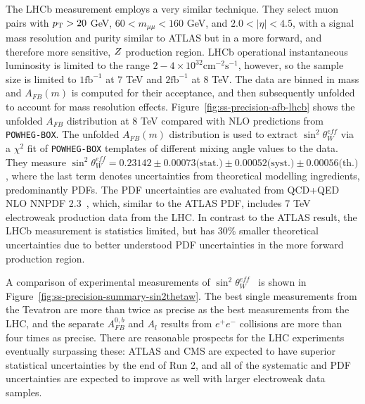 The LHCb measurement employs a very similar technique.  They select
muon pairs with $p_{\mathrm{T}} > 20$ GeV, $60 < m_{\mu\mu} < 160$ GeV, and $2.0 <
|\eta| < 4.5$, with a signal mass resolution and purity similar to
ATLAS but in a more forward, and therefore more sensitive, $Z$
production region.  LHCb operational instantaneous luminosity is
limited to the range $2-4\times
10^{32}\textrm{cm}^{-2}\textrm{s}^{-1}$, however, so the sample size
is limited to $1 \textrm{fb}^{-1}$ at 7 TeV and $2 \textrm{fb}^{-1}$
at 8 TeV.  The data are binned in mass and $A_{FB}(m)$ is computed for
their acceptance, and then subsequently unfolded to account for mass
resolution effects. Figure~\ref{fig:ss-precision-afb-lhcb} shows the
unfolded $A_{FB}$ distribution at 8 TeV compared with NLO predictions
from \texttt{POWHEG-BOX}.  The unfolded $A_{FB}(m)$ distribution is
used to extract $\sin^2\theta^{eff}_{W}$ via a $\chi^2$ fit
of \texttt{POWHEG-BOX} templates of different mixing angle values to
the data.  They measure $\sin^2\theta^{eff}_{W} = 0.23142 \pm
0.00073 \textrm{(stat.)} \pm 0.00052 \textrm{(syst.)} \pm
0.00056 \textrm{(th.)}$, where the last term denotes uncertainties
from theoretical modelling ingredients, predominantly PDFs.  The PDF
uncertainties are evaluated from QCD+QED NLO NNPDF
2.3~\cite{Ball:2013hta,Ball:2012cx}, which, similar to the ATLAS PDF,
includes 7 TeV electroweak production data from the LHC.  In contrast
to the ATLAS result, the LHCb measurement is statistics limited, but
has 30\% smaller theoretical uncertainties due to better understood
PDF uncertainties in the more forward production region.

A comparison of experimental measurements of
$\sin^2\theta^{eff}_{W}$~\cite{Aaltonen:2016nuy} is shown in
Figure~\ref{fig:ss-precision-summary-sin2thetaw}.  The best single
measurements from the Tevatron are more than twice as precise as the
best measurements from the LHC, and the separate $A^{0,b}_{FB}$ and
$A_{l}$ results from $e^+e^-$ collisions are more than four times as
precise.  There are reasonable prospects for the LHC experiments
eventually surpassing these: ATLAS and CMS are expected to have
superior statistical uncertainties by the end of Run 2, and all of the
systematic and PDF uncertainties are expected to improve as well with
larger electroweak data samples.

